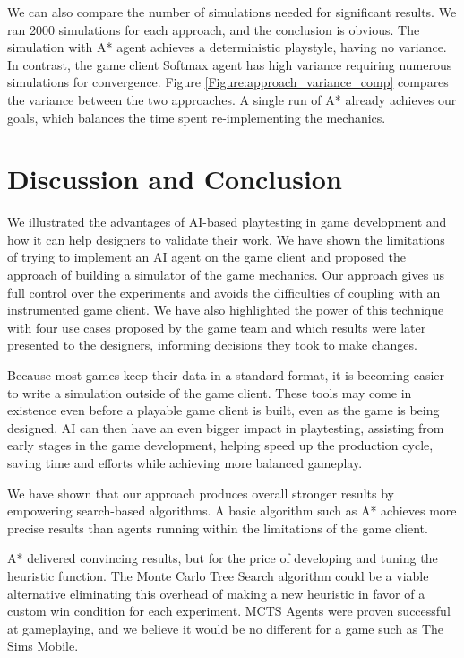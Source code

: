 \documentclass[letterpaper]{article} %
\begin{document}
We can also compare the number of simulations needed for significant results. We ran 2000 simulations for each approach, and the conclusion is obvious. The simulation with A* agent achieves a deterministic playstyle, having no variance. In contrast, the game client Softmax agent has high variance requiring numerous simulations for convergence. Figure \ref{Figure:approach_variance_comp} compares the variance between the two approaches. A single run of A* already achieves our goals, which balances the time spent re-implementing the mechanics.

\section{Discussion and Conclusion}

We illustrated the advantages of AI-based playtesting in game development and how it can help designers to validate their work. We have shown the limitations of trying to implement an AI agent on the game client and proposed the approach of building a simulator of the game mechanics. Our approach gives us full control over the experiments and avoids the difficulties of coupling with an instrumented game client. We have also highlighted the power of this technique with four use cases proposed by the game team and which results were later presented to the designers, informing decisions they took to make changes.

Because most games keep their data in a standard format, it is becoming easier to write a simulation outside of the game client. These tools may come in existence even before a playable game client is built, even as the game is being designed. AI can then have an even bigger impact in playtesting, assisting from early stages in the game development, helping speed up the production cycle, saving time and efforts while achieving more balanced gameplay.

We have shown that our approach produces overall stronger results by empowering search-based algorithms. A basic algorithm such as A* achieves more precise results than agents running within the limitations of the game client.

A* delivered convincing results, but for the price of developing and tuning the heuristic function. The Monte Carlo Tree Search algorithm could be a viable alternative eliminating this overhead of making a new heuristic in favor of a custom win condition for each experiment. MCTS Agents were proven successful at gameplaying, and we believe it would be no different for a game such as The Sims Mobile.
\end{document}

